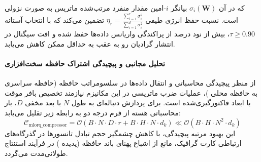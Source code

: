 که در آن $\sigma_i(\mathbf{W})$ بیانگر $i$-امین مقدار منفرد مرتب‌شده ماتریس به صورت نزولی است. نسبت حفظ انرژی طیفی $\eta_r = \frac{\sum_{i=1}^r \sigma_i^2}{\sum_{i=1}^{d} \sigma_i^2}$ تضمین می‌کند که با انتخاب آستانه $\tau \ge 0.90$، بیش از نود درصد از پراکندگی واریانس داده‌ها حفظ شده و افت سیگنال در انتشار گرادیان رو به عقب به حداقل ممکن کاهش می‌یابد.

\paragraph{تحلیل مجانبی و پیچیدگی اشتراک حافظه سخت‌افزاری}
از منظر پیچیدگی محاسباتی و انتقال داده‌ها در سلسومراتب حافظه (حافظه سراسری  به حافظه محلی )، عملیات ضرب ماتریسی در این مکانیزم نیازمند تخصیص بافر موقت با ابعاد فاکتورگیری‌شده است. برای پردازش دنباله‌ای به طول $N$ با بعد مخفی $D$، بار محاسباتی هسته از فرم درجه دو به رابطه زیر تقلیل می‌یابد:
\begin{equation}
\label{eq:complexity_mlorq_compressor}
\mathcal{C}_{\text{mlorq\_compressor}} = \mathcal{O}\left( B \cdot N \cdot D \cdot r + B \cdot H \cdot N \cdot d_k \right) \ll \mathcal{O}\left( B \cdot H \cdot N^2 \cdot d_k \right)
\end{equation}
این بهبود مرتبه پیچیدگی، با کاهش چشمگیر حجم تبادل تانسورها در گذرگاه‌های ارتباطی کارت گرافیک، مانع از اشباع پهنای باند حافظه (پدیده ) در فرآیند استنتاج طولانی‌مدت می‌گردد.
